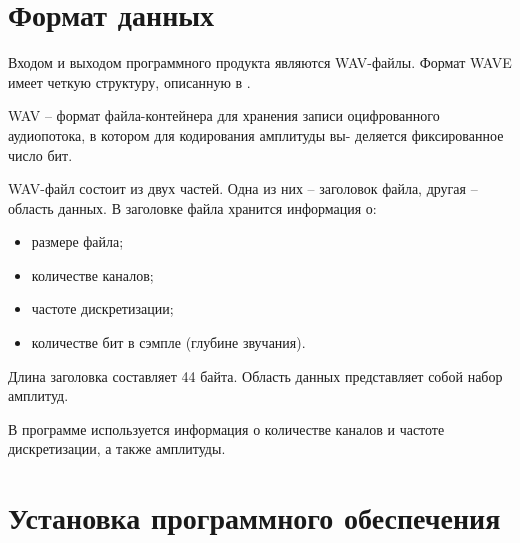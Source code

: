 \section{Формат данных}

Входом и выходом программного продукта являются WAV-файлы. Формат WAVE имеет четкую структуру, описанную в \cite{wavv}.

WAV -- формат файла-контейнера для хранения записи оцифрованного аудиопотока, в котором для кодирования амплитуды вы- деляется фиксированное число бит.

WAV-файл состоит из двух частей. Одна из них -- заголовок файла, другая -- область данных. В заголовке файла хранится информация о:

\begin{itemize}
	\item размере файла;
	\item количестве каналов;
	\item частоте дискретизации;
	\item количестве бит в сэмпле (глубине звучания).
\end{itemize}

Длина заголовка составляет 44 байта. Область данных представляет собой набор амплитуд. 

В программе используется информация о количестве каналов и частоте дискретизации, а также амплитуды.

\section{Установка программного обеспечения}

